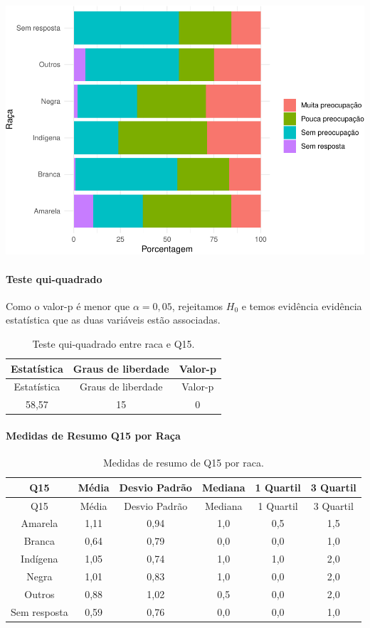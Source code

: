 \documentclass[]{article}
\let\oldparagraph\paragraph
\renewcommand{\paragraph}[1]{\oldparagraph{#1}\mbox{}}
\begin{document}
\begin{center}\includegraphics[width=0.75\linewidth]{relatorio_files/figure-latex/unnamed-chunk-120-1} \end{center}

\hypertarget{teste-qui-quadrado-10}{%
\paragraph{Teste qui-quadrado}\label{teste-qui-quadrado-10}}

Como o valor-p é menor que \(\alpha=0,05\), rejeitamos \(H_0\) e temos evidência evidência estatística que as duas variáveis estão associadas.

\begin{longtable}[]{@{}ccc@{}}
\caption{\label{tab:unnamed-chunk-121}Teste qui-quadrado entre raca e Q15.}\tabularnewline
\toprule
Estatística & Graus de liberdade & Valor-p\tabularnewline
\midrule
\endfirsthead
\toprule
Estatística & Graus de liberdade & Valor-p\tabularnewline
\midrule
\endhead
58,57 & 15 & 0\tabularnewline
\bottomrule
\end{longtable}

\cleardoublepage

\hypertarget{medidas-de-resumo-q15-por-rauxe7a}{%
\paragraph{Medidas de Resumo Q15 por Raça}\label{medidas-de-resumo-q15-por-rauxe7a}}

\begin{longtable}[]{@{}cccccc@{}}
\caption{\label{tab:unnamed-chunk-122}Medidas de resumo de Q15 por raca.}\tabularnewline
\toprule
Q15 & Média & Desvio Padrão & Mediana & 1 Quartil & 3 Quartil\tabularnewline
\midrule
\endfirsthead
\toprule
Q15 & Média & Desvio Padrão & Mediana & 1 Quartil & 3 Quartil\tabularnewline
\midrule
\endhead
Amarela & 1,11 & 0,94 & 1,0 & 0,5 & 1,5\tabularnewline
Branca & 0,64 & 0,79 & 0,0 & 0,0 & 1,0\tabularnewline
Indígena & 1,05 & 0,74 & 1,0 & 1,0 & 2,0\tabularnewline
Negra & 1,01 & 0,83 & 1,0 & 0,0 & 2,0\tabularnewline
Outros & 0,88 & 1,02 & 0,5 & 0,0 & 2,0\tabularnewline
Sem resposta & 0,59 & 0,76 & 0,0 & 0,0 & 1,0\tabularnewline
\bottomrule
\end{longtable}
\end{document}

